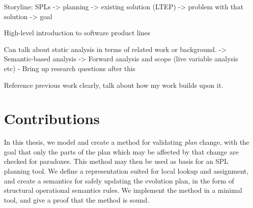 
Storyline: SPLs -> planning -> existing solution (LTEP) -> problem with that solution -> goal

High-level introduction to software product lines

Can talk about static analysis in terms of related work or background.
-> Semantic-based analysis
-> Forward analysis and scope (live variable analysis etc)
- Bring up research questions after this

Reference previous work clearly, talk about how my work builds upon it.

\section{Contributions}

In this thesis, we model and create a method for validating \emph{plan} change, with the goal that only the parts of the plan which may be affected by that change are checked for paradoxes. This method may then be used as basis for an SPL planning tool. We define a representation suited for local lookup and assignment, and create a semantics for safely updating the evolution plan, in the form of structural operational semantics rules. We implement the method in a minimal tool, and give a proof that the method is sound.

